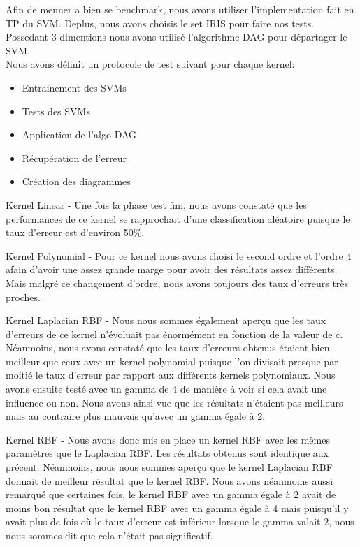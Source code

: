 \documentclass[fontsize=10pt, twoside=no]{scrartcl} %
\begin{document}
Afin de menner a bien se benchmark, nous avons utiliser l'implementation fait en TP du SVM. Deplus, nous avons choisis le set IRIS pour faire nos tests. Possedant 3 dimentions nous avons utilisé l'algorithme DAG pour départager le SVM.\\

\noindent Nous avons définit un protocole de test suivant pour chaque kernel:
\begin{itemize}
	\item Entrainement des SVMs
	\item Tests des SVMs
	\item Application de l'algo DAG
	\item Récupération de l'erreur
	\item Création des diagrammes
\end{itemize}

\item[Kernel Linear - ] Une fois la phase test fini, nous avons constaté que les performances de ce kernel se rapprochait d'une classification aléatoire puisque le taux d'erreur  est d'environ 50\%.\\

\item[Kernel Polynomial - ] Pour ce kernel nous avons choisi le second ordre et l'ordre 4 afain d'avoir une assez grande marge pour avoir des résultats assez différents. Mais malgré ce changement d'ordre, nous avons toujours des taux d'erreurs très proches.\\

\item[Kernel Laplacian RBF - ] Nous nous sommes également aperçu que les taux d'erreurs de ce kernel n'évoluait pas énormément en fonction de la valeur de c. Néanmoins, nous avons constaté que les taux d'erreurs obtenus étaient bien meilleur que ceux avec un kernel polynomial puisque l'on divisait presque par moitié le taux d'erreur par rapport aux différents kernels polynomiaux. Nous avons ensuite testé avec un gamma de 4 de manière à voir si cela avait une influence ou non. Nous avons ainsi vue que les résultats n'étaient pas meilleurs mais au contraire plus mauvais qu'avec un gamma égale à 2.\\

\item [Kernel RBF - ] Nous avons donc mis en place un kernel RBF avec les mêmes paramètres que le Laplacian RBF. Les résultats obtenus sont identique aux précent. Néanmoins, nous nous sommes aperçu que le kernel Laplacian RBF donnait de meilleur résultat que le kernel RBF. Nous avons néanmoins aussi remarqué que certaines fois, le kernel RBF avec un gamma égale à 2 avait de moins bon résultat que le kernel RBF avec un gamma égale à 4 mais puisqu'il y avait plus de fois où le taux d'erreur est inférieur lorsque le gamma valait 2, nous nous sommes dit que cela n'était pas significatif.\\
\end{document}
